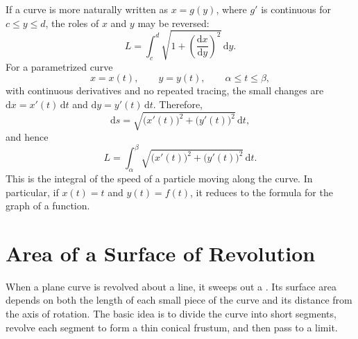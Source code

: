 If a curve is more naturally written as \(x=g(y)\), where \(g'\) is
continuous for \(c\leq y\leq d\), the roles of \(x\) and \(y\) may be
reversed:
\[
    L=\int_c^d\sqrt{1+\left(\frac{\mathrm{d}x}{\mathrm{d}y}\right)^2}
      \,\mathrm{d}y.
\]
For a parametrized curve
\[
    x=x(t),\qquad y=y(t),\qquad \alpha\leq t\leq\beta,
\]
with continuous derivatives and no repeated tracing, the small changes are
\(\mathrm{d}x=x'(t)\,\mathrm{d}t\) and
\(\mathrm{d}y=y'(t)\,\mathrm{d}t\).  Therefore,
\[
    \mathrm{d}s
    =\sqrt{\bigl(x'(t)\bigr)^2+\bigl(y'(t)\bigr)^2}\,\mathrm{d}t,
\]
and hence
\[
    L=\int_\alpha^\beta
      \sqrt{\bigl(x'(t)\bigr)^2+\bigl(y'(t)\bigr)^2}\,\mathrm{d}t.
\]
This is the integral of the speed of a particle moving along the curve.  In
particular, if \(x(t)=t\) and \(y(t)=f(t)\), it reduces to the formula for
the graph of a function.

\section{Area of a Surface of Revolution}

When a plane curve is revolved about a line, it sweeps out a
.  Its surface area depends on both the length
of each small piece of the curve and its distance from the axis of rotation.
The basic idea is to divide the curve into short segments, revolve each
segment to form a thin conical frustum, and then pass to a limit.

